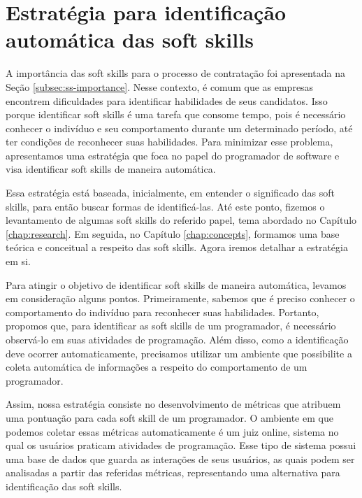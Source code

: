 

\chapter{Estratégia para identificação automática das soft skills}

\label{chap:metrics}

A importância das soft skills para o processo de contratação foi apresentada na Seção \ref{subsec:ss-importance}. Nesse contexto, é comum que as empresas encontrem dificuldades para identificar habilidades de seus candidatos. Isso porque identificar soft skills é uma tarefa que consome tempo, pois é necessário conhecer o indivíduo e seu comportamento durante um determinado período, até ter condições de reconhecer suas habilidades. Para minimizar esse problema, apresentamos uma estratégia que foca no papel do programador de software e visa identificar soft skills de maneira automática.


Essa estratégia está baseada, inicialmente, em entender o significado das soft skills, para então buscar formas de identificá-las.
Até este ponto, fizemos o levantamento de algumas soft skills do referido papel, tema abordado no Capítulo \ref{chap:research}. Em seguida, no Capítulo \ref{chap:concepts}, formamos uma base teórica e conceitual a respeito das soft skills.
Agora iremos detalhar a estratégia em si.

Para atingir o objetivo de identificar soft skills de maneira automática, levamos em consideração alguns pontos. Primeiramente, sabemos que é preciso conhecer o comportamento do indivíduo para reconhecer suas habilidades. Portanto, propomos que, para identificar as soft skills de um programador, é necessário observá-lo em suas atividades de programação. Além disso, como a identificação deve ocorrer automaticamente, precisamos utilizar um ambiente que possibilite a coleta automática de informações a respeito do comportamento de um programador.

Assim, nossa estratégia consiste no desenvolvimento de métricas que atribuem uma pontuação para cada soft skill de um programador. O ambiente em que podemos coletar essas métricas automaticamente é um juiz online, sistema no qual os usuários praticam atividades de programação. Esse tipo de sistema possui uma base de dados que guarda as interações de seus usuários, as quais podem ser analisadas a partir das referidas métricas, representando uma alternativa para identificação das soft skills.

